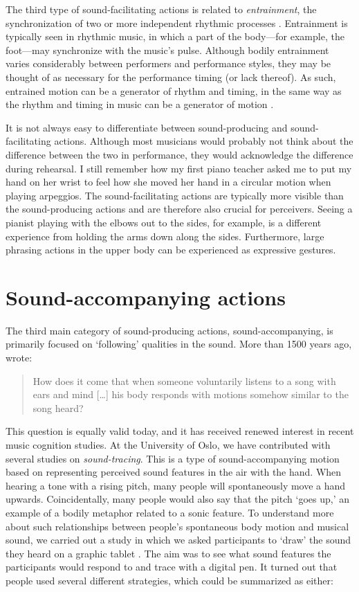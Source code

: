 The third type of sound-facilitating actions is related to \emph{entrainment}, the synchronization of two or more independent rhythmic processes \citep{clayton_time_2005,clayton_interpersonal_2020}. Entrainment is typically seen in rhythmic music, in which a part of the body---for example, the foot---may synchronize with the music's pulse. Although bodily entrainment varies considerably between performers and performance styles, they may be thought of as necessary for the performance timing (or lack thereof). As such, entrained motion can be a generator of rhythm and timing, in the same way as the rhythm and timing in music can be a generator of motion \citep{clarke_body_1998}.

It is not always easy to differentiate between sound-producing and sound-facilitating actions. Although most musicians would probably not think about the difference between the two in performance, they would acknowledge the difference during rehearsal. I still remember how my first piano teacher asked me to put my hand on her wrist to feel how she moved her hand in a circular motion when playing arpeggios. The sound-facilitating actions are typically more visible than the sound-producing actions and are therefore also crucial for perceivers. Seeing a pianist playing with the elbows out to the sides, for example, is a different experience from holding the arms down along the sides. Furthermore, large phrasing actions in the upper body can be experienced as expressive gestures.


\section{Sound-accompanying actions}\label{sec:accompanying}

The third main category of sound-producing actions, sound-accompanying, is primarily focused on `following' qualities in the sound. More than 1500 years ago, \citet[p.8]{boethius_fundamentals_1989} wrote:

\begin{quote}
How does it come that when someone voluntarily listens to a song with ears and mind [\ldots] his body responds with motions somehow similar to the song heard?
\end{quote}

This question is equally valid today, and it has received renewed interest in recent music cognition studies. At the University of Oslo, we have contributed with several studies on \emph{sound-tracing}. This is a type of sound-accompanying motion based on representing perceived sound features in the air with the hand. When hearing a tone with a rising pitch, many people will spontaneously move a hand upwards. Coincidentally, many people would also say that the pitch `goes up,' an example of a bodily metaphor related to a sonic feature. To understand more about such relationships between people's spontaneous body motion and musical sound, we carried out a study in which we asked participants to `draw' the sound they heard on a graphic tablet \citep{godoy_exploring_2006}. The aim was to see what sound features the participants would respond to and trace with a digital pen. It turned out that people used several different strategies, which could be summarized as either:

